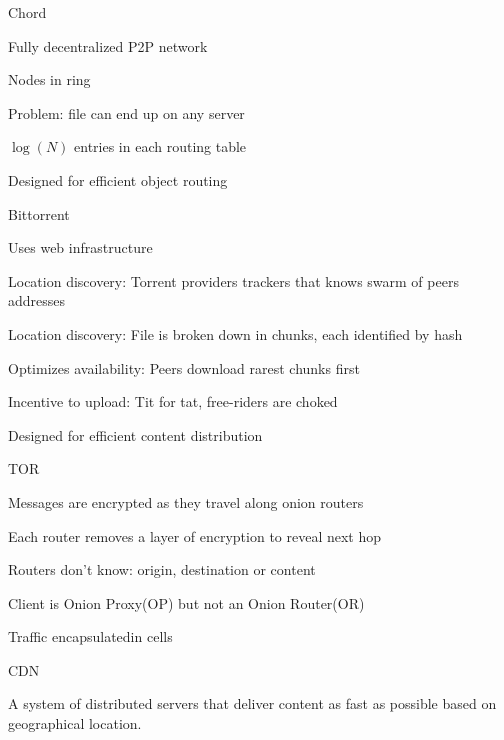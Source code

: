 \documentclass[main.tex]{subfiles}
\begin{document}
\begin{card}{Chord}
\item Fully decentralized P2P network
\item Nodes in ring
\item Problem: file can end up on any server
\item $\log(N)$ entries in each routing table
\item Designed for efficient object routing
\end{card}

\begin{card}{Bittorrent}
\item Uses web infrastructure
\item Location discovery: Torrent providers trackers that knows swarm of peers addresses
\item Location discovery: File is broken down in chunks, each identified by hash
\item Optimizes availability: Peers download rarest chunks first
\item Incentive to upload: Tit for tat, free-riders are choked
\item Designed for efficient content distribution
\end{card}

\begin{card}{TOR}
\item Messages are encrypted as they travel along onion routers
\item Each router removes a layer of encryption to reveal next hop
\item Routers don't know: origin, destination or content
\item Client is Onion Proxy(OP) but not an Onion Router(OR)
\item Traffic encapsulatedin cells
\end{card}

\begin{card}{CDN}
\item A system of distributed servers that deliver content as fast as possible based on geographical location.
\end{card}



\end{document}
